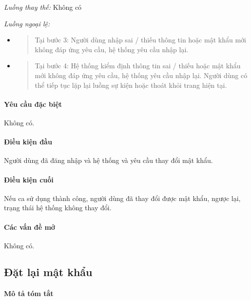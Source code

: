 \documentclass[./../main.tex]{subfiles}
\begin{document}
\emph{Luồng thay thế:} Không có

\emph{Luồng ngoại lệ:}

\begin{itemize}
\item
  \begin{quote}
  Tại bước 3: Người dùng nhập sai / thiếu thông tin hoặc mật khẩu mới
  không đáp ứng yêu cầu, hệ thống yêu cầu nhập lại.
  \end{quote}
\item
  \begin{quote}
  Tại bước 4: Hệ thống kiểm định thông tin sai / thiếu hoặc mật khẩu mới
  không đáp ứng yêu cầu, hệ thống yêu cầu nhập lại. Người dùng có thể
  tiếp tục lặp lại luồng sự kiện hoặc thoát khỏi trang hiện tại.
  \end{quote}
\end{itemize}

\paragraph*{Yêu cầu đặc biệt}

Không có.

\paragraph*{Điều kiện đầu}

Người dùng đã đăng nhập và hệ thống và yêu cầu thay đổi mật khẩu.

\paragraph*{Điều kiện cuối}

Nếu ca sử dụng thành công, người dùng đã thay đổi được mật khẩu, ngược
lại, trạng thái hệ thống không thay đổi.

\paragraph*{Các vấn đề mở}

Không có.

\subsection{Đặt lại mật khẩu}
\paragraph*{Mô tả tóm tắt}
\end{document}
